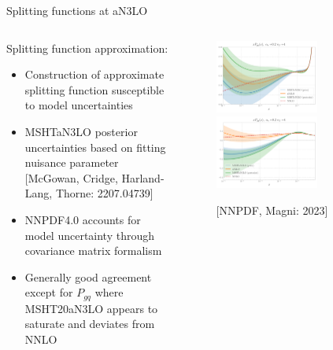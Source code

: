 \documentclass[aspectratio=169, 8pt,t]{beamer}
\begin{document}
\begin{frame}{Splitting functions at aN3LO}
  \begin{columns}[T]
    \begin{column}{0.49\textwidth}
      Splitting function approximation:
      \begin{itemize}
        \item Construction of approximate splitting function susceptible to  model uncertainties
        \item MSHTaN3LO posterior uncertainties based on fitting nuisance parameter {\color{gray}\small[McGowan, Cridge, Harland-Lang, Thorne: 2207.04739]}
        \item NNPDF4.0 accounts for model uncertainty through covariance matrix formalism
        \item Generally good agreement except for $P_{gq}$ where MSHT20aN3LO appears to saturate and deviates from NNLO
      \end{itemize}
    \end{column}
    \begin{column}{0.49\textwidth}
      \vspace*{-4em}
      \begin{figure}
        \includegraphics[width=0.65\textwidth]{figures/gamma_gg_msht_logx.pdf}\\
        \includegraphics[width=0.65\textwidth]{figures/gamma_gq_msht_logx.pdf}
        \caption*{\color{gray}\small [NNPDF, Magni: 2023]}
      \end{figure}
    \end{column}
  \end{columns}
\end{frame}
\end{document}
